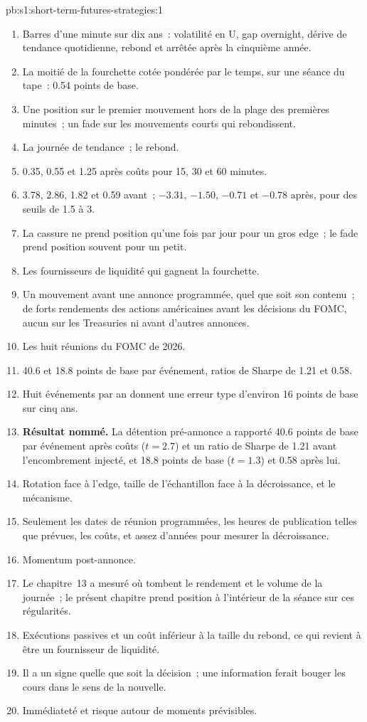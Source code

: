 \begin{solution}{pb:s1:short-term-futures-strategies:1}
\begin{enumerate}
\item Barres d'une minute sur dix ans~: volatilité en U, gap overnight, dérive de tendance quotidienne, rebond et  arrêtée après la cinquième année.
\item La moitié de la fourchette cotée pondérée par le temps, sur une séance du tape~: 0.54 points de base.
\item Une position sur le premier mouvement hors de la plage des premières minutes~; un fade sur les mouvements courts qui rebondissent.
\item La journée de tendance~; le rebond.
\item 0.35, 0.55 et 1.25 après coûts pour 15, 30 et 60 minutes.
\item 3.78, 2.86, 1.82 et 0.59 avant~; $-3.31$, $-1.50$, $-0.71$ et $-0.78$ après, pour des seuils de 1.5 à 3.
\item La cassure ne prend position qu'une fois par jour pour un gros edge~; le fade prend position souvent pour un petit.
\item Les fournisseurs de liquidité qui gagnent la fourchette.
\item Un mouvement avant une annonce programmée, quel que soit son contenu~; de forts rendements des actions américaines avant les décisions du FOMC, aucun sur les Treasuries ni avant d'autres
annonces.
\item Les huit réunions du FOMC de 2026.
\item 40.6 et 18.8 points de base par événement, ratios de Sharpe de 1.21 et 0.58.
\item Huit événements par an donnent une erreur type d'environ 16 points de base sur cinq ans.
\item \textbf{Résultat nommé.} La détention pré-annonce a rapporté 40.6 points de base par événement après coûts ($t = 2.7$) et un ratio de Sharpe de 1.21 avant
l'encombrement injecté, et 18.8 points de base ($t = 1.3$) et 0.58 après lui.
\item Rotation face à l'edge, taille de l'échantillon face à la décroissance, et le mécanisme.
\item Seulement les dates de réunion programmées, les heures de publication telles que prévues, les coûts, et assez d'années pour mesurer la décroissance.
\item Momentum post-annonce.
\item Le chapitre~13 a mesuré où tombent le rendement et le volume de la journée~; le présent chapitre prend position à l'intérieur de la séance sur ces régularités.
\item Exécutions passives et un coût inférieur à la taille du rebond, ce qui revient à être un fournisseur de liquidité.
\item Il a un signe quelle que soit la décision~; une information ferait bouger les cours dans le sens de la nouvelle.
\item Immédiateté et risque autour de moments prévisibles.
\end{enumerate}
\end{solution}

